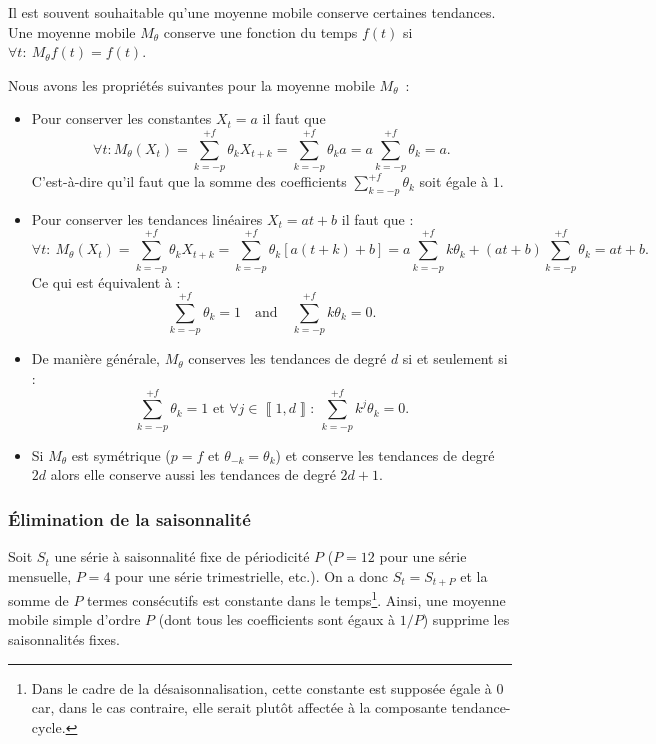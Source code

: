 \documentclass[
  11pt,
  french,
  a4paper]{article}
\newcommand\1{\mathds{1}}
\begin{document}
Il est souvent souhaitable qu'une moyenne mobile conserve certaines tendances.
Une moyenne mobile \(M_\theta\) conserve une fonction du temps \(f(t)\) si \(\forall t:\:M_\theta f(t)=f(t)\).

Nous avons les propriétés suivantes pour la moyenne mobile \(M_\theta\)~:

\begin{itemize}
\item
  Pour conserver les constantes \(X_t=a\) il faut que
  \[
  \forall t:M_\theta(X_t)=\sum_{k=-p}^{+f}\theta_kX_{t+k}=\sum_{k=-p}^{+f}\theta_ka=a\sum_{k=-p}^{+f}\theta_k=a.
  \]
  C'est-à-dire qu'il faut que la somme des coefficients \(\sum_{k=-p}^{+f}\theta_k\) soit égale à \(1\).
\item
  Pour conserver les tendances linéaires \(X_t=at+b\) il faut que :
  \[
  \forall t:\:M_\theta(X_t)=\sum_{k=-p}^{+f}\theta_kX_{t+k}=\sum_{k=-p}^{+f}\theta_k[a(t+k)+b]=a\sum_{k=-p}^{+f}k\theta_k+(at+b)\sum_{k=-p}^{+f}\theta_k=at+b.
  \]
  Ce qui est équivalent à :
  \[
  \sum_{k=-p}^{+f}\theta_k=1
  \quad\text{and}\quad
  \sum_{k=-p}^{+f}k\theta_k=0.
  \]
\item
  De manière générale, \(M_\theta\) conserves les tendances de degré \(d\) si et seulement si :
  \[
  \sum_{k=-p}^{+f}\theta_k=1 
   \text{ et } 
  \forall j \in \left\llbracket 1,d\right\rrbracket:\:
  \sum_{k=-p}^{+f}k^j\theta_k=0.
  \]
\item
  Si \(M_\theta\) est symétrique (\(p=f\) et \(\theta_{-k} = \theta_k\)) et conserve les tendances de degré \(2d\) alors elle conserve aussi les tendances de degré \(2d+1\).
\end{itemize}

\hypertarget{uxe9limination-de-la-saisonnalituxe9}{%
\subsubsection{Élimination de la saisonnalité}\label{uxe9limination-de-la-saisonnalituxe9}}

Soit \(S_t\) une série à saisonnalité fixe de périodicité \(P\) (\(P=12\) pour une série mensuelle, \(P=4\) pour une série trimestrielle, etc.).
On a donc \(S_t=S_{t+P}\) et la somme de \(P\) termes consécutifs est constante dans le temps\footnote{
  Dans le cadre de la désaisonnalisation, cette constante est supposée égale à 0 car, dans le cas contraire, elle serait plutôt affectée à la composante tendance-cycle.}. Ainsi, une moyenne mobile simple d'ordre \(P\) (dont tous les coefficients sont égaux à \(1/P\)) supprime les saisonnalités fixes.
\end{document}
